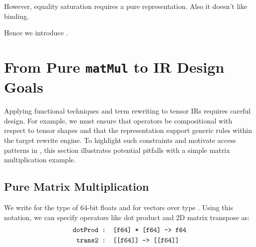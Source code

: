 However, equality saturation requires
  a pure representation.
Also it doesn't like binding.

Hence we introduce \g.




\section{From Pure \texttt{matMul} to IR Design Goals}
\label{sec:matmul}

  
Applying functional techniques
  and term rewriting to tensor IRs
  requires careful design.
For example,
  we must ensure that operators be compositional
  with respect to tensor shapes
  and that the representation support
  generic rules within the
  target rewrite engine.
To highlight such constraints and
  motivate access patterns in \g,
  this section illustrates potential pitfalls
  with a simple matrix multiplication example.

\subsection{Pure Matrix Multiplication}
\label{subsec:pure-matmul}

We write
   for the type of 64-bit floats and
  \tcd{[A]} for vectors over type .
Using this notation, we can specify operators like
  dot product and 2D matrix transpose as:
\begin{align*}
    \mathrm{\texttt{dotProd}} &
    \mathrm{\texttt{ : [f64] * [f64] -> f64}} \\
    \mathrm{\texttt{trans2}} &
    \mathrm{\texttt{ : [[f64]] -> [[f64]]}}
\end{align*} 


